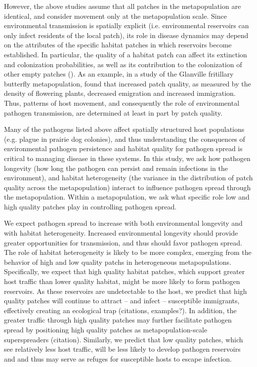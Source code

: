 \documentclass{svjour3}
\begin{document}
However, the above studies assume that all patches in the metapopulation are identical, and consider movement only at the metapopulation scale.  Since environmental transmission is spatially explicit (i.e. environmental reservoirs can only infect residents of the local patch), its role in disease dynamics may depend on the attributes of the specific habitat patches in which reservoirs become established.  In particular, the quality of a habitat patch can affect its extinction and colonization probabilities, as well as its contribution to the colonization of other empty patches (\cite{Moilanen1998}).  As an example, in a study of the Glanville fritillary butterfly metapopulation, \cite{Moilanen1998} found that increased patch quality, as measured by the density of flowering plants, decreased emigration and increased immigration.  Thus, patterns of host movement, and consequently the role of environmental pathogen transmission, are determined at least in part by patch quality.  

Many of the pathogens listed above affect spatially structured host populations (e.g. plague in prairie dog colonies), and thus understanding the consquences of environmental pathogen persistence and habitat quality for pathogen spread is critical to managing disease in these systems.  In this study, we ask how pathogen longevity (how long the pathogen can persist and remain infections in the environment), and habitat heterogeneity (the variance in the distribution of patch quality across the metapopulation) interact to influence pathogen spread through the metapopulation.  Within a metapopulation, we ask what specific role low and high quality patches play in controlling pathogen spread.  

We expect pathogen spread to increase with both environmental longevity and with habitat heterogeneity.  Increased environmental longevity should provide greater opportunities for transmission, and thus should favor pathogen spread.  The role of habitat heterogeneity is likely to be more complex, emerging from the behavior of high and low quality patchs in heterogeneous metapopulations.  Specifically, we expect that high quality habitat patches, which support greater host traffic than lower quality habitat, might be more likely to form pathogen reservoirs.  As these reservoirs are undetectable to the host, we predict that high quality patches will continue to attract -- and infect -- susceptible immigrants, effectively creating an ecological trap (citations, examples?).  In addition, the greater traffic through high quality patches may further facilitate pathogen spread by positioning high quality patches as metapopulation-scale superspreaders (citation).  Similarly, we predict that low quality patches, which see relatively less host traffic, will be less likely to develop pathogen reservoirs and and thus may serve as refuges for susceptible hosts to escape infection.  
\end{document}

